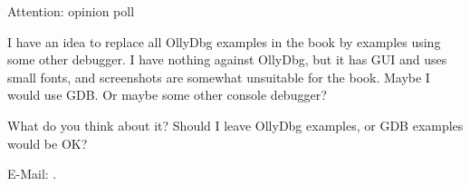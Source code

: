 \vspace*{\fill}

\huge Attention: opinion poll
\normalsize

\bigskip
\bigskip
\bigskip

I have an idea to replace all OllyDbg examples in the book by examples using some other debugger.
I have nothing against OllyDbg, but it has GUI and uses small fonts, and screenshots are somewhat unsuitable for the book.
Maybe I would use GDB.
Or maybe some other console debugger?

What do you think about it?
Should I leave OllyDbg examples, or GDB examples would be OK?

E-Mail: \GTT{\EMAIL}.

\vspace*{\fill}
\vfill
